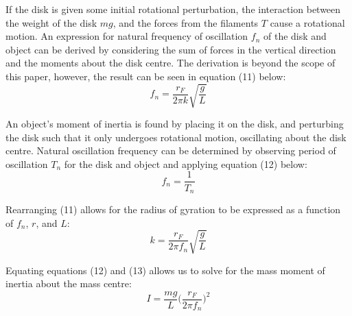 \documentclass[a4paper]{article}
\begin{document}
If the disk is given some initial rotational perturbation, the interaction between the weight of the disk $mg$, and the forces from the filaments $T$ cause a rotational motion. An expression for natural frequency of oscillation $f_n$ of the disk and object can be derived by considering the sum of forces in the vertical direction and the moments about the disk centre. The derivation is beyond the scope of this paper, however, the result can be seen in equation (11) below:
\begin{equation}
f_n = \frac{r_F}{2 \pi k} \sqrt{\frac{g}{L}}
\end{equation}

An object's moment of inertia is found by placing it on the disk, and perturbing the disk such that it only undergoes rotational motion, oscillating about the disk centre. Natural oscillation frequency can be determined by observing period of oscillation $T_n$ for the disk and object and applying equation (12) below:
\begin{equation}
f_n = \frac{1}{T_n}
\end{equation}

Rearranging (11) allows for the radius of gyration to be expressed as a function of $f_n$, $r$, and $L$:
\begin{equation}
k = \frac{r_F}{2 \pi f_n} \sqrt{\frac{g}{L}}
\end{equation}

Equating equations (12) and (13) allows us to solve for the mass moment of inertia about the mass centre:
\begin{equation}
	I = \frac{mg}{L} \bigg( \frac{r_F}{2 \pi f_n} \bigg)^2
\end{equation}

\newpage
\end{document}
